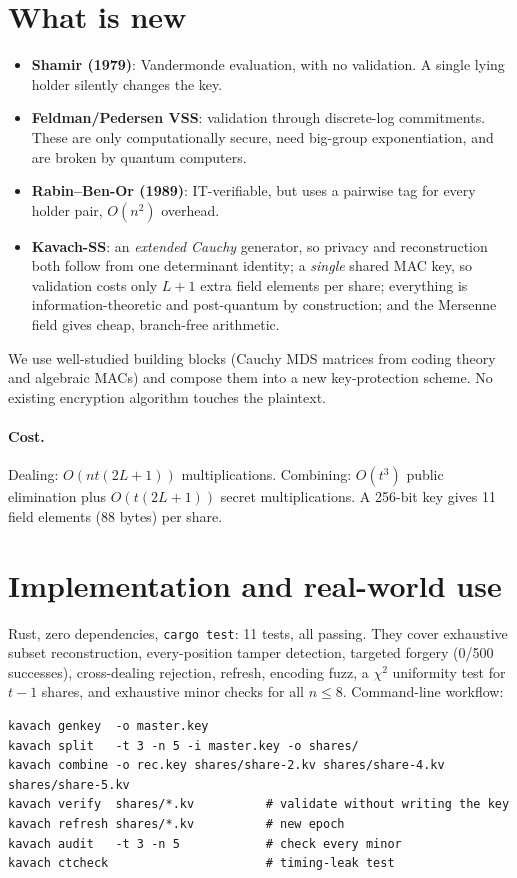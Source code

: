 \documentclass[11pt]{article}
\theoremstyle{remark}
\begin{document}
\section{What is new}
\begin{itemize}[leftmargin=*,itemsep=2pt]
\item \textbf{Shamir (1979)}: Vandermonde evaluation, with no validation. A single
lying holder silently changes the key.
\item \textbf{Feldman/Pedersen VSS}: validation through discrete-log commitments.
These are only computationally secure, need big-group exponentiation, and are
broken by quantum computers.
\item \textbf{Rabin--Ben-Or (1989)}: IT-verifiable, but uses a pairwise tag for every
holder pair, $O(n^2)$ overhead.
\item \textbf{Kavach-SS}: an \emph{extended Cauchy} generator, so privacy and
reconstruction both follow from one determinant identity; a \emph{single} shared
MAC key, so validation costs only $L+1$ extra field elements per share;
everything is information-theoretic and post-quantum by construction; and the
Mersenne field gives cheap, branch-free arithmetic.
\end{itemize}
We use well-studied building blocks (Cauchy MDS matrices from coding theory and
algebraic MACs) and compose them into a new key-protection scheme. No existing
encryption algorithm touches the plaintext.

\paragraph{Cost.} Dealing: $O(nt(2L+1))$ multiplications. Combining:
$O(t^3)$ public elimination plus $O(t(2L+1))$ secret multiplications.
A 256-bit key gives 11 field elements (88 bytes) per share.

\section{Implementation and real-world use}
Rust, zero dependencies, \texttt{cargo test}: 11 tests, all passing. They cover
exhaustive subset reconstruction, every-position tamper detection, targeted
forgery (0/500 successes), cross-dealing rejection, refresh, encoding fuzz, a
$\chi^2$ uniformity test for $t-1$ shares, and exhaustive minor checks for all
$n\le 8$. Command-line workflow:
\begin{verbatim}
kavach genkey  -o master.key
kavach split   -t 3 -n 5 -i master.key -o shares/
kavach combine -o rec.key shares/share-2.kv shares/share-4.kv shares/share-5.kv
kavach verify  shares/*.kv          # validate without writing the key
kavach refresh shares/*.kv          # new epoch
kavach audit   -t 3 -n 5            # check every minor
kavach ctcheck                      # timing-leak test
\end{verbatim}
\end{document}
